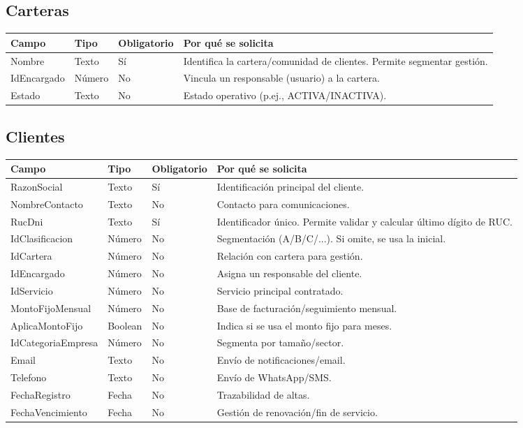 \documentclass[11pt,a4paper]{article}
\begin{document}
\subsection{Carteras}
\begin{longtable}{|p{3.2cm}|p{2.2cm}|p{2.2cm}|p{4.8cm}|}
\hline
\textbf{Campo} & \textbf{Tipo} & \textbf{Obligatorio} & \textbf{Por qué se solicita} \\
\hline
Nombre & Texto & Sí & Identifica la cartera/comunidad de clientes. Permite segmentar gestión. \\
IdEncargado & Número & No & Vincula un responsable (usuario) a la cartera. \\
Estado & Texto & No & Estado operativo (p.ej., ACTIVA/INACTIVA). \\
\hline
\end{longtable}

\subsection{Clientes}
\begin{longtable}{|p{3.2cm}|p{2.2cm}|p{2.2cm}|p{6.0cm}|}
\hline
\textbf{Campo} & \textbf{Tipo} & \textbf{Obligatorio} & \textbf{Por qué se solicita} \\
\hline
RazonSocial & Texto & Sí & Identificación principal del cliente. \\
NombreContacto & Texto & No & Contacto para comunicaciones. \\
RucDni & Texto & Sí & Identificador único. Permite validar y calcular último dígito de RUC. \\
IdClasificacion & Número & No & Segmentación (A/B/C/...). Si omite, se usa la inicial. \\
IdCartera & Número & No & Relación con cartera para gestión. \\
IdEncargado & Número & No & Asigna un responsable del cliente. \\
IdServicio & Número & No & Servicio principal contratado. \\
MontoFijoMensual & Número & No & Base de facturación/seguimiento mensual. \\
AplicaMontoFijo & Boolean & No & Indica si se usa el monto fijo para meses. \\
IdCategoriaEmpresa & Número & No & Segmenta por tamaño/sector. \\
Email & Texto & No & Envío de notificaciones/email. \\
Telefono & Texto & No & Envío de WhatsApp/SMS. \\
FechaRegistro & Fecha & No & Trazabilidad de altas. \\
FechaVencimiento & Fecha & No & Gestión de renovación/fin de servicio. \\
\hline
\end{longtable}
\end{document}
